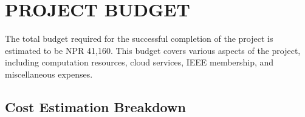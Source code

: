 


\chapter{PROJECT BUDGET}
The total budget required for the successful completion of the project is estimated to be NPR 41,160. This budget covers various aspects of the project, including computation resources, cloud services, IEEE membership, and miscellaneous expenses.

\section{Cost Estimation Breakdown}

